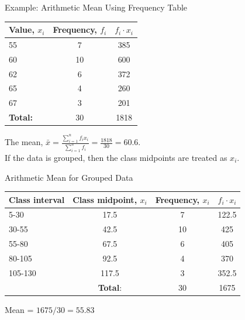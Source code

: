 \documentclass[12pt, aspectratio=169]{beamer}
\begin{document}
    \begin{frame}{Example: Arithmetic Mean Using Frequency Table}
        \begin{center}
            \begin{tabular}{lcc}
                \toprule
                \textbf{Value, $x_i$} & \textbf{Frequency}, $f_i$ & $f_i \cdot x_i$ \\
                \midrule
                55 & 7  & 385\\
                60 & 10 & 600\\
                62 & 6  & 372\\
                65 & 4  & 260\\
                67 & 3  & 201\\
                \bottomrule
                \textbf{Total:} & 30 & 1818
            \end{tabular}
        \end{center}
        The mean, $\bar{x} = \frac{\sum_{i=1}^{n} f_i x_i}{\sum_{i=1}^{n} f_i} = \frac{1818}{30}=60.6$.\\[0.5em]

        If the data is grouped, then the class midpoints are treated as $x_i$.
    \end{frame}


    \begin{frame}{Arithmetic Mean for Grouped Data}
        \begin{center}
            \begin{tabular}{lccc}
                \toprule
                \textbf{Class interval} & \textbf{Class midpoint}, $x_i$ & \textbf{Frequency}, $x_i$ & $f_i \cdot x_i$\\
                \midrule
                5-30    & 17.5  & 7  & 122.5 \\
                30-55   & 42.5  & 10 & 425 \\
                55-80   & 67.5  & 6  & 405 \\
                80-105  & 92.5  & 4  & 370 \\
                105-130 & 117.5 & 3  & 352.5 \\
                \bottomrule
                 & \textbf{Total}: & 30 & 1675
            \end{tabular}
        \end{center}
        Mean = $1675/30 = 55.83$
    \end{frame}
\end{document}
